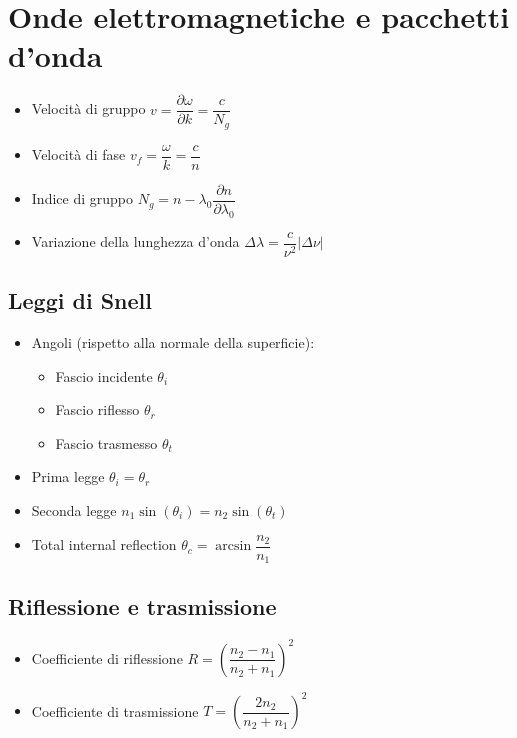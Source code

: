 \documentclass{article}
\begin{document}
\section{Onde elettromagnetiche e pacchetti d'onda}
\begin{itemize}
\item Velocità di gruppo \( v = \dfrac{\partial \omega}{\partial k} = \dfrac{c}{N_g} \)
\item Velocità di fase \( v_f = \dfrac{\omega}{k} = \dfrac{c}{n}  \)
\item Indice di gruppo \( N_g = n - \lambda_0 \dfrac{\partial n}{\partial \lambda_0} \)
\item Variazione della lunghezza d'onda \( \Delta \lambda = \dfrac{c}{\nu^2} | \Delta \nu | \)
\end {itemize}

\subsection{Leggi di Snell}
\begin{itemize}
  \item Angoli (rispetto alla normale della superficie):
        \begin{itemize}
          \item Fascio incidente \( \theta_i \)
          \item Fascio riflesso  \( \theta_r \)
          \item Fascio trasmesso \( \theta_t \)
        \end{itemize}
  \item Prima legge \( \theta_i = \theta_r \)
  \item Seconda legge \( n_1 \sin(\theta_i) = n_2 \sin(\theta_t) \)
  \item Total internal reflection \( \theta_c = \arcsin\dfrac{n_2}{n_1} \)
\end{itemize}

\subsection{Riflessione e trasmissione}
\begin{itemize}
  \item Coefficiente di riflessione \( R = \left( \dfrac{n_2 - n_1}{n_2 + n_1} \right) ^ 2 \)
  \item Coefficiente di trasmissione \( T = \left( \dfrac{2 n_2}{n_2 + n_1} \right) ^ 2 \)
\end{itemize}
\end{document}
